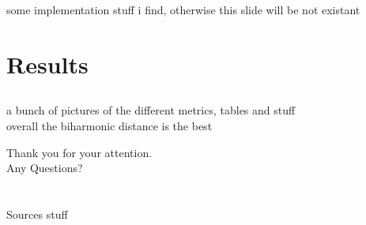 \documentclass[]{beamer}
\begin{document}
	\begin{frame}
		some implementation stuff i find, otherwise this slide will be not existant
	\end{frame}

\section{Results}
\subsection*{}
	\begin{frame}
		a bunch of pictures of the different metrics, tables and stuff\\
		overall the biharmonic distance is the best
	\end{frame}


	\begin{frame}
		\centering \large
		Thank you for your attention.\\
		Any Questions?
	\end{frame}

\section*{} %
\appendix
	\begin{frame}{Sources}
		stuff
	\end{frame}
\end{document}
